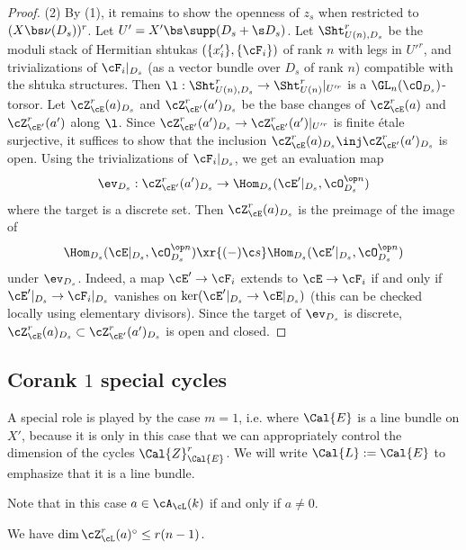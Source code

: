 \begin{proof}
(2) By (1),  it remains to show the openness of $z_s$ when restricted to $(X\bs \nu(D_{s}))^{r}$. Let $U'=X'\bs \supp(D_{s}+\s D_{s})$. Let $\Sht^{r}_{U(n),D_{s}}$ be the moduli stack of Hermitian shtukas $(\{x'_{i}\}, \{\cF_{i}\})$ of rank $n$ with legs in $U'^{r}$, and trivializations of $\cF_{i}|_{D_{s}}$ (as a vector bundle over $D_{s}$ of rank $n$) compatible with the shtuka structures. Then $\l: \Sht^{r}_{U(n),D_{s}}\to \Sht^{r}_{U(n)}|_{U'^{r}}$ is a $\GL_{n}(\cO_{D_{s}})$-torsor. Let $\cZ^{r}_{\cE}(a)_{D_{s}}$ and $\cZ^{r}_{\cE'}(a')_{D_{s}}$ be the base changes of $\cZ^{r}_{\cE}(a)$ and $\cZ^{r}_{\cE'}(a')$ along $\l$. Since $\cZ^{r}_{\cE'}(a')_{D_{s}}\to \cZ^{r}_{\cE'}(a')|_{U'^{r}}$ is finite \'etale surjective, it suffices to show that the inclusion $\cZ^{r}_{\cE}(a)_{D_{s}}\inj \cZ^{r}_{\cE'}(a')_{D_{s}}$ is open. Using the trivializations of $\cF_{i}|_{D_{s}}$, we get an evaluation map
\begin{equation}
\ev_{D_{s}}: \cZ^{r}_{\cE'}(a')_{D_{s}}\to \Hom_{D_{s}}(\cE'|_{D_{s}}, \cO_{D_{s}}^{\op n})
\end{equation}
where the target is a discrete set. Then $\cZ^{r}_{\cE}(a)_{D_{s}}$ is the preimage of the image of
\begin{equation}
\Hom_{D_{s}}(\cE|_{D_{s}}, \cO_{D_{s}}^{\op n}) \xr{(-)\c s} \Hom_{D_{s}}(\cE'|_{D_{s}}, \cO_{D_{s}}^{\op n})
\end{equation}
under $\ev_{D_{s}}$. Indeed, a map $\cE'\to \cF_{i}$ extends to $\cE\to \cF_{i}$ if and only if $\cE'|_{D_{s}}\to \cF_{i}|_{D_{s}}$ vanishes on $\ker(\cE'|_{D_{s}}\to \cE|_{D_{s}})$ (this can be checked locally using elementary divisors). Since the target of $\ev_{D_{s}}$ is discrete, $\cZ^{r}_{\cE}(a)_{D_{s}}\subset \cZ^{r}_{\cE'}(a')_{D_{s}}$ is open and closed.
\end{proof}


\subsection{Corank $1$ special cycles}

A special role is played by the case $m=1$, i.e. where $\Cal{E}$ is a line bundle on $X'$, because it is only in this case that we can appropriately control the dimension of the cycles $\Cal{Z}_{\Cal{E}}^{r}$. We will write $\Cal{L} := \Cal{E}$ to emphasize that it is a line bundle.

Note that in this case $a \in \cA_{\cL}(k)$ if and only if $a \neq 0$.

\begin{prop}
\notready\label{prop: dim Z_L}
We have $\dim \cZ_{\cL}^{r}(a)^{\circ} \leq r(n-1)$.
\end{prop}

